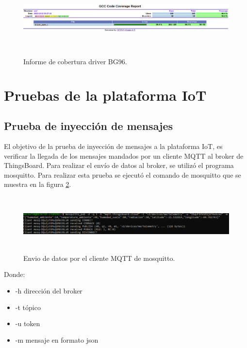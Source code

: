 \begin{figure}[h!]
    \centering
      \includegraphics[width=\linewidth, height=4cm]{./Figures/cobertura_bg96.png}
    \caption{Informe de cobertura driver BG96.}
      \label{fig:Cobertura BG96}
\end{figure}

\section{Pruebas de la plataforma IoT}
\subsection{Prueba de inyección de mensajes}
El objetivo de la prueba de inyección de mensajes a la plataforma IoT, es verificar la llegada de los mensajes mandados por un cliente MQTT al broker de ThingsBoard.
Para realizar el envío de datos al broker, se utilizó el programa mosquitto. Para realizar esta prueba se ejecutó el comando de mosquitto que se muestra en la figura \ref{fig:mosquitto pub}.

\begin{figure}[h!]
  \centering
    \includegraphics[width=\linewidth, height=3cm]{./Figures/mosquito_enviodatos.png}
  \caption{Envio de datos por el cliente MQTT de mosquitto.}
    \label{fig:mosquitto pub}
\end{figure}

Donde:
\begin{itemize}
  \item -h dirección del broker
  \item -t tópico 
  \item -u token
  \item -m mensaje en formato json
\end{itemize}

